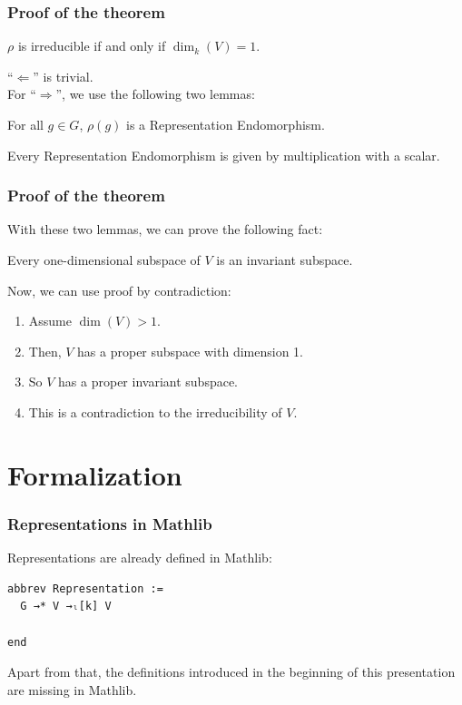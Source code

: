\documentclass{beamer}
\begin{document}
\begin{frame}
\frametitle{Proof of the theorem}
\begin{theorem}
\(\rho\) is irreducible if and only if \(\dim_k(V) = 1\).
\end{theorem}
\enquote{\(\Leftarrow\)} is trivial.\\
For \enquote{\(\Rightarrow\)}, we use the following two lemmas:
\begin{lemma}
For all \(g \in G\), \(\rho(g)\) is a Representation Endomorphism.
\end{lemma}
\begin{lemma}
Every Representation Endomorphism is given by multiplication with a scalar.
\end{lemma}
\end{frame}


\begin{frame}
\frametitle{Proof of the theorem}
With these two lemmas, we can prove the following fact:
\begin{lemma}
Every one-dimensional subspace of \(V\) is an invariant subspace.
\end{lemma}
\pause
Now, we can use proof by contradiction:
\pause
\begin{enumerate}
\item Assume \(\dim (V) > 1\).
\pause
\item Then, \(V\) has a proper subspace with dimension 1.
\pause
\item So \(V\) has a proper invariant subspace.
\pause
\item This is a contradiction to the irreducibility of \(V\).
\end{enumerate}
\end{frame}

\section{Formalization}
\begin{frame}[fragile]
\frametitle{Representations in Mathlib}
Representations are already defined in Mathlib:
\begin{lstlisting}
abbrev Representation :=
  G →* V →ₗ[k] V

end
\end{lstlisting}
\pause
Apart from that, the definitions introduced in the beginning of this presentation are missing in Mathlib.
\end{frame}
\end{document}
